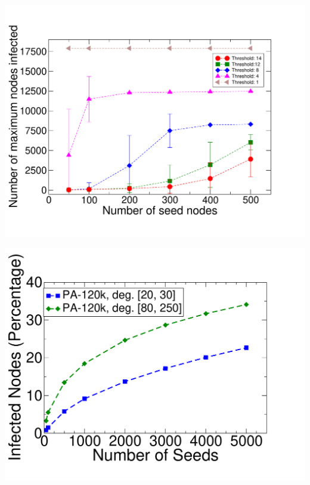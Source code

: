 \documentclass[landscape,paperwidth=70in,paperheight=46in,fontscale=0.225]{baposter} %
\begin{document}
\begin{poster}
{\begin{minipage}{0.5\linewidth}
\centering
\includegraphics[trim = 0in 0in 0in 0.4in, clip, scale=0.16]{figures/astroph_threshold_cs.pdf} 
\end{minipage}
\hfill
\begin{minipage}{0.5\linewidth}
\centering
\includegraphics[trim = 0in 0in 0in 0.2in, clip, scale=0.16]{figures/pref_cs.pdf} 
\end{minipage}


}
\end{poster}
\end{document}
